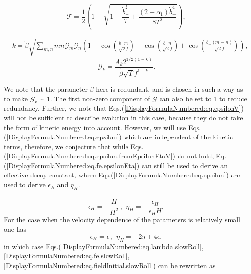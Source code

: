 \documentclass[12pt]{article}
\begin{document}
\begin{equation}
  \mathcal{T}=\frac{1}{2} \left(1+\sqrt{1-\frac{{\dot{b}}_-^2}{T}+\frac{\left(2-\alpha_1\right){\dot{b}}_-^4}{8T^2}}\right),
\end{equation}

\begin{equation}
  \begin{split}
    & k=\tilde\beta\sqrt{\sum_{m, n}m n \mathcal{G}_m\mathcal{G}_n \left(1-\cos\left(\frac{b_- m}{\sqrt{2}f}\right)-\cos\left(\frac{b_- n}{\sqrt{2}f}\right)+\cos\left(\frac{b_- \left(m-n\right)}{\sqrt{2}f}\right)\right)},
  \end{split}
\end{equation}
\begin{equation}
  \mathcal{G}_k=\frac{A_k2^{1/2\left(1-k\right)}}{\tilde\beta\sqrt{T}f^{1-k}}.
\end{equation}


We note that the parameter $\tilde\beta$ here is redundant, and is chosen in such a way as to make $\mathcal{G}_k\sim 1$. The first non-zero component of $\mathcal{G}$ can also be set to $1$ to reduce redundancy.
Further, we note that Eqs.(\ref{DisplayFormulaNumbered:eq.epsilonV}) will not be sufficient to describe evolution in this case, because they do not take the form of kinetic energy into account. However, we will use
Eqs.(\ref{DisplayFormulaNumbered:eq.epsilon}) which are independent of the kinetic terms, therefore, we conjecture that while Eqs.(\ref{DisplayFormulaNumbered:eq.epsilon.fromEpsilonEtaV}) do not hold, Eq.(\ref{DisplayFormulaNumbered:eq.fe.epsilonEta}) can still be used to derive an effective decay constant, where Eqs.(\ref{DisplayFormulaNumbered:eq.epsilon}) are used to derive $\epsilon_H$ and $\eta_H$.

\begin{equation}\label{DisplayFormulaNumbered:eq.epsilon}
  \epsilon_H =-\frac{\dot{H}}{H^2}\,,
  ~~\eta_H =-\frac{\dot{\epsilon_H}}{\epsilon_H H},
\end{equation}
For the case when the velocity dependence of the parameters is relatively small one has
\begin{equation}\label{DisplayFormulaNumbered:eq.epsilon.fromEpsilonEtaV}
  \epsilon_H =\epsilon\,,
  ~~\eta_H =-2\eta+4\epsilon,
\end{equation}
in which case Eqs.(\ref{DisplayFormulaNumbered:eq.lambda.slowRoll}, \ref{DisplayFormulaNumbered:eq.fe.slowRoll}, \ref{DisplayFormulaNumbered:eq.fieldInitial.slowRoll}) can be rewritten as
\end{document}
